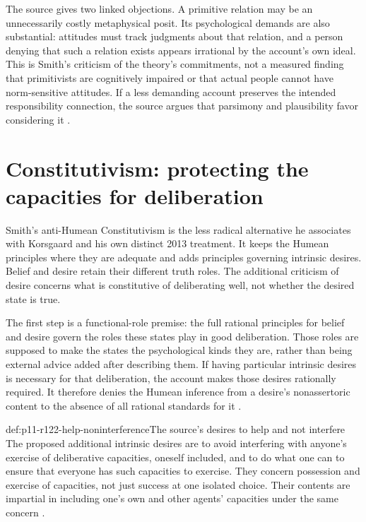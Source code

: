 The source gives two linked objections. A primitive relation may be an
unnecessarily costly metaphysical posit. Its psychological demands are
also substantial: attitudes must track judgments about that relation,
and a person denying that such a relation exists appears irrational by
the account's own ideal. This is Smith's criticism of the theory's
commitments, not a measured finding that primitivists are cognitively
impaired or that actual people cannot have norm-sensitive attitudes.
If a less demanding account preserves the intended responsibility
connection, the source argues that parsimony and plausibility favor
considering it \parencite[p.~699]{Smith2021MoralReasons}.

\section{Constitutivism: protecting the capacities for deliberation}
\label{sec:p11-r122-constitutivism}

Smith's anti-Humean Constitutivism is the less radical alternative he
associates with Korsgaard and his own distinct 2013 treatment. It keeps
the Humean principles where they are adequate and adds principles
governing intrinsic desires. Belief and desire retain their different
truth roles. The additional criticism of desire concerns what is
constitutive of deliberating well, not whether the desired state is true.

The first step is a functional-role premise: the full rational principles
for belief and desire govern the roles these states play in good
deliberation. Those roles are supposed to make the states the psychological
kinds they are, rather than being external advice added after describing
them. If having particular intrinsic desires is necessary for
that deliberation, the account makes those desires rationally required.
It therefore denies the Humean inference from a desire's nonassertoric
content to the absence of all rational standards for it
\parencite[p.~699]{Smith2021MoralReasons}.

\begin{hbdefinition}{def:p11-r122-help-noninterference}{The source's desires to help and not interfere}
The proposed additional intrinsic desires are to avoid interfering
with anyone's exercise of deliberative capacities, oneself included,
and to do what one can to ensure that everyone has such capacities
to exercise. They concern possession and exercise of capacities, not
just success at one isolated choice. Their contents are impartial in
including one's own and other agents' capacities under the same concern
\parencite[p.~699]{Smith2021MoralReasons}.
\end{hbdefinition}

